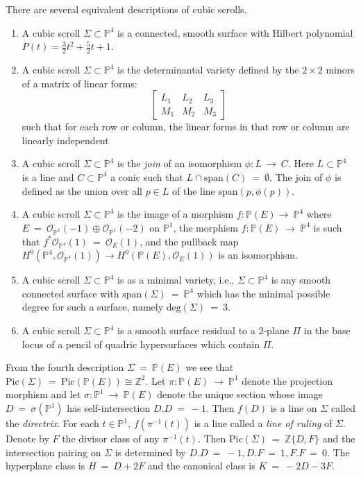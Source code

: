 \documentclass[twoside,12pt,reqno]{amsart}
\theoremstyle{plain}
\theoremstyle{definition}
\newcommand{\ZZ}{\mathbb{Z}}
\newcommand{\PP}{\mathbb{P}}
\def\ps{\vspace{4pt}}
\newcommand{\lt}{\left}
\newcommand{\rt}{\right}
\newcommand{\OO}{\mathcal O}
\newlength{\extraitemseplength}
\newcommand{\extraitemsep}{\rule[-\extraitemseplength]{0cm}{\extraitemseplength}}
\begin{document}
There are several equivalent descriptions of cubic scrolls.  
\begin{enumerate}
\item A cubic scroll $\Sigma \subset \PP^4$ is a connected, smooth
surface with Hilbert polynomial $P(t)  =  \frac{3}{2}t^2 + \frac{5}{2}t
+ 1$. 
\extraitemsep

\item A cubic scroll $\Sigma\subset
\PP^4$ is the determinantal variety defined by the $2\times 2$ minors of 
a matrix of linear forms:
\vskip -0.8cm
\begin{equation}\lt[ \begin{array} {ccc}
 L_1 & L_2 & L_3 \\
 M_1 & M_2 & M_3 
\end{array} \rt]\end{equation}
such that for each row or column, the linear forms in
that row or column are linearly independent 
\extraitemsep

\item A cubic scroll $\Sigma\subset \PP^4$ is the \emph{join} of an
isomorphism $\phi:L~\rightarrow~ C$.  Here $L\subset \PP^4$ is a line and
$C\subset \PP^4$ a conic such that $L\cap
\text{span}(C) ~=~\emptyset$.  The join of $\phi$ is defined as the
union over all $p\in L$ of the line $\text{span}(p,\phi(p))$.  
\extraitemsep

\item A cubic scroll $\Sigma\subset \PP^4$ is the image of a morphism $f:\PP(E)
\rightarrow~ \PP^4$ where 
$E~=~\OO_{\PP^1}(-1)\oplus \OO_{\PP^1}(-2)$ on $\PP^1$, the morphism $f:\PP(E)
~\rightarrow~ \PP^4$ is such that $f^*\OO_{\PP^4}(1) ~=~ \OO_{E}(1)$,
and the pullback map $H^0(\PP^4,\OO_{\PP^4}(1))\rightarrow H^0(\PP(E),
\OO_{E}(1))$ is an isomorphism.
\extraitemsep

\item A cubic scroll $\Sigma\subset \PP^4$ is as
a minimal variety, i.e., $\Sigma\subset \PP^4$ is any smooth connected 
surface with $\text{span}(\Sigma)~=~\PP^4$ which has the minimal
possible degree for such a surface, namely $\text{deg}(\Sigma)~=~3$. 
\extraitemsep

\item A cubic scroll $\Sigma\subset \PP^4$ is a smooth surface residual to a
2-plane $\Pi$ in the base locus of a pencil of quadric hypersurfaces
which contain $\Pi$.  
\end{enumerate}

\ps

From the fourth description $\Sigma ~=~ \PP(E)$ we see that
$\text{Pic}(\Sigma) ~=~ \text{Pic}(\PP(E)) \cong \ZZ^2$.  Let $\pi:\PP(E)
~\rightarrow~ \PP^1$ denote the projection morphism and let
$\sigma:\PP^1~\rightarrow~ \PP(E)$ denote the unique section whose image
$D~=~\sigma(\PP^1)$ has self-intersection $D.D~=~-1$.  Then $f(D)$ is a
line on $\Sigma$ called the \emph{directrix}.  For each $t\in
\PP^1$, $f(\pi^{-1}(t))$ is a line called a \emph{line of ruling} of
$\Sigma$.  Denote by $F$ the divisor class of any $\pi^{-1}(t)$.  Then
$\text{Pic}(\Sigma) ~=~ \ZZ\{D,F\}$ and the intersection pairing on
$\Sigma$ is determined by $D.D ~=~ -1, D.F ~=~1, F.F ~=~0$.  The hyperplane
class is $H~=~D+2F$ and the canonical class is $K ~=~ -2D-3F$.  
\end{document}
